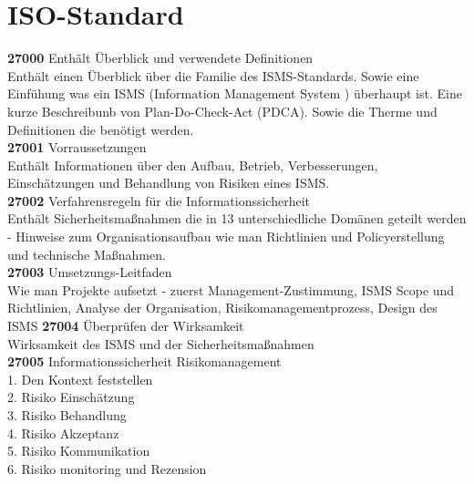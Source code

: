 \documentclass[a4paper,10pt]{scrartcl}
\begin{document}
\section{ISO-Standard}


\textbf{27000} Enthält Überblick und verwendete Definitionen\\
Enthält einen Überblick über die Familie des ISMS-Standards. Sowie
eine Einfühung was ein ISMS (Information Management System ) überhaupt ist.
Eine kurze Beschreibunb von Plan-Do-Check-Act (PDCA). Sowie die Therme und Definitionen
die benötigt werden.
\\
\textbf{27001} Vorraussetzungen\\
Enthält Informationen über den Aufbau, Betrieb, Verbesserungen, Einschätzungen und Behandlung von Risiken eines ISMS.\\
\textbf{27002} Verfahrensregeln für die Informationssicherheit\\
Enthält Sicherheitsmaßnahmen die in 13 unterschiedliche Domänen geteilt werden - Hinweise zum Organisationsaufbau
wie man Richtlinien und Policyerstellung und technische Maßnahmen.\\
\textbf{27003} Umsetzungs-Leitfaden\\
Wie man Projekte aufsetzt - zuerst Management-Zustimmung, ISMS Scope und Richtlinien, Analyse der Organisation, Risikomanagementprozess, Design des ISMS
\textbf{27004} Überprüfen der Wirksamkeit\\
Wirksamkeit des ISMS und der Sicherheitsmaßnahmen\\
\textbf{27005} Informationssicherheit Risikomanagement\\
1. Den Kontext feststellen\\
2. Risiko Einschätzung\\
3. Risiko Behandlung\\
4. Risiko Akzeptanz\\
5. Risiko Kommunikation\\
6. Risiko monitoring und Rezension\\
\end{document}
